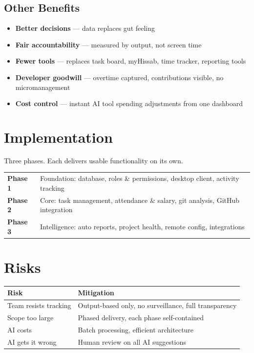\documentclass[12pt,a4paper]{article}
\begin{document}
\subsection{Other Benefits}

\begin{itemize}[nosep]
    \item \textbf{Better decisions} --- data replaces gut feeling
    \item \textbf{Fair accountability} --- measured by output, not screen time
    \item \textbf{Fewer tools} --- replaces task board, myHissab, time tracker, reporting tools
    \item \textbf{Developer goodwill} --- overtime captured, contributions visible, no micromanagement
    \item \textbf{Cost control} --- instant AI tool spending adjustments from one dashboard
\end{itemize}

\section{Implementation}

Three phases. Each delivers usable functionality on its own.

\begin{center}
\renewcommand{\arraystretch}{1.5}
\begin{tabularx}{\textwidth}{l X}
    \toprule
    \textbf{Phase 1} & Foundation: database, roles \& permissions, desktop client, activity tracking \\
    \textbf{Phase 2} & Core: task management, attendance \& salary, git analysis, GitHub integration \\
    \textbf{Phase 3} & Intelligence: auto reports, project health, remote config, integrations \\
    \bottomrule
\end{tabularx}
\end{center}

\section{Risks}

\begin{center}
\renewcommand{\arraystretch}{1.4}
\begin{tabularx}{\textwidth}{l X}
    \toprule
    \textbf{Risk} & \textbf{Mitigation} \\
    \midrule
    Team resists tracking & Output-based only, no surveillance, full transparency \\
    Scope too large & Phased delivery, each phase self-contained \\
    AI costs & Batch processing, efficient architecture \\
    AI gets it wrong & Human review on all AI suggestions \\
    \bottomrule
\end{tabularx}
\end{center}
\end{document}
